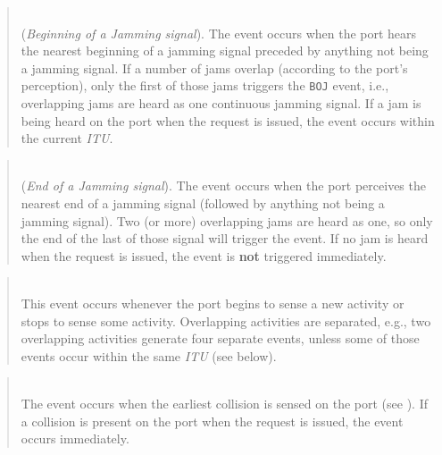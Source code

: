 \begin{quote}
\noindent{}\\ \hspace{0in}
({\em Beginning of a Jamming signal\/}).
The event occurs when the port hears the nearest beginning of
a jamming signal preceded by anything not being a jamming signal.
If a number of jams overlap (according to the port's perception), only the
first of those jams triggers the {\tt BOJ} event, i.e.,
overlapping jams are heard as one continuous jamming signal.
If a jam is being heard on the port when the request is issued,
the event occurs within the current {\em ITU}.
\end{quote}

\begin{quote}
\noindent{}\\ \hspace{0in}
({\em End of a Jamming signal\/}).
The event occurs when the port perceives the nearest end of a jamming signal
(followed by anything not being a jamming signal).
Two (or more) overlapping jams are heard as one,
so only the end of the last of those signal will trigger the event.
If no jam is heard when the request is issued,
the event is {\bf not} triggered immediately.
\end{quote}

\begin{quote}
\noindent{}\\ \hspace{0in}
This event occurs whenever the port begins to
sense a new activity or stops to sense some activity.
Overlapping activities are separated, e.g.,
two overlapping activities generate
four separate events, unless some of those events occur within the same
{\em ITU\/} (see below).
\end{quote}

\begin{quote}
\noindent{}\\ \hspace{0in}
The event occurs when the earliest collision is sensed on the port
(see ).
If a collision is present on the port when the request is issued, the event
occurs immediately.
\end{quote}\medskip

